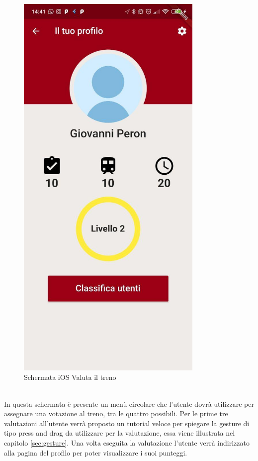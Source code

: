 \hfill
\begin{minipage}{0.45\textwidth}
	\begin{figure}[H]
		\centering
		\includegraphics[width=0.8\textwidth]{immagini/profile.jpg}
		\caption{Schermata iOS Valuta il treno}
	\end{figure}
\end{minipage}
\vspace{1cm}
\\
In questa schermata è presente un menù circolare che l'utente dovrà utilizzare per assegnare una votazione al treno, tra le quattro possibili.
Per le prime tre valutazioni all'utente verrà proposto un tutorial veloce per spiegare la gesture di tipo press and drag da utilizzare per la valutazione, essa viene illustrata nel capitolo \ref{sec:gesture}. Una volta eseguita la valutazione l'utente verrà indirizzato alla pagina del profilo per poter visualizzare i suoi punteggi.

